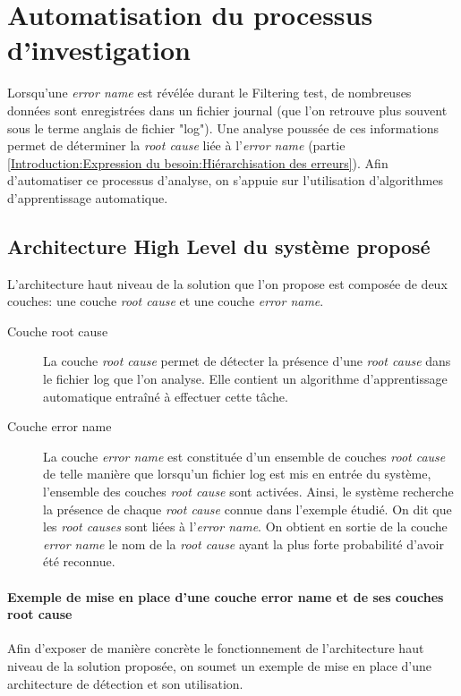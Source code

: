 \chapter{Automatisation du processus d'investigation}
\label{Automatisation du processus d'investigation}
\thispagestyle{fancy}
Lorsqu'une \emph{error name} est révélée durant le Filtering test, de nombreuses données sont enregistrées dans un fichier journal (que l'on retrouve plus souvent sous le terme anglais de fichier "log"). Une analyse poussée de ces informations permet de déterminer la \emph{root cause} liée à l'\emph{error name} (partie \ref{Introduction:Expression du besoin:Hiérarchisation des erreurs}). Afin d'automatiser ce processus d'analyse, on s'appuie sur l'utilisation d'algorithmes d'apprentissage automatique. 

\section{Architecture High Level du système proposé}
\label{Automatisation du processus d'investigation: Achitecture High Level du système proposé}
L'architecture haut niveau de la solution que l'on propose est composée de deux couches: une couche \emph{root cause} et une couche \emph{error name}.
\begin{description}
	\item [Couche root cause] La couche \emph{root cause} permet de détecter la présence d'une \emph{root cause} dans le fichier log que l'on analyse. Elle contient un algorithme d'apprentissage automatique entraîné à effectuer cette tâche.
	\item [Couche error name] La couche \emph{error name} est constituée d'un ensemble de couches \emph{root cause} de telle manière que lorsqu'un fichier log est mis en entrée du système, l'ensemble des couches \emph{root cause} sont activées. Ainsi, le système recherche la présence de chaque \emph{root cause} connue dans l'exemple étudié. On dit que les \emph{root causes} sont liées à l'\emph{error name}. On obtient en sortie de la couche \emph{error name} le nom de la \emph{root cause} ayant la plus forte probabilité d'avoir été reconnue.
\end{description} 

\subsubsection{Exemple de mise en place  d'une couche error name et de ses couches root cause}
\label{Automatisation du processus d'investigation: Achitecture High Level du système proposé: Exemple de mise en place  d'une couche error name et de ses couches root cause}
Afin d'exposer de manière concrète le fonctionnement de l'architecture haut niveau de la solution proposée, on soumet un exemple de mise en place d'une architecture de détection et son utilisation. \\

